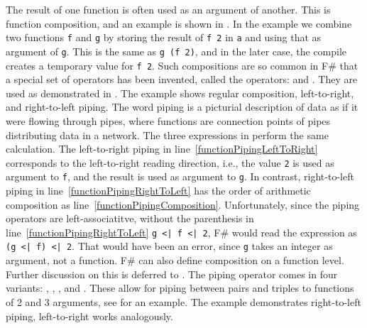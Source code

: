 \documentclass[fsharpnotes.tex]{subfiles}
\begin{document}
The result of one function is often used as an argument of another. This is function composition, and an example is shown in .
%
%
In the example we combine two functions \lstinline{f} and \lstinline{g} by storing the result of \lstinline{f 2} in \lstinline{a} and using that as argument of \lstinline{g}. This is the same as \lstinline{g (f 2)}, and in the later case, the compile creates a temporary value for \lstinline{f 2}. Such compositions are so common in F\# that a special set of operators has been invented, called the  operators: \idx[{|>}@\lstinline{|>}]{\lexeme{|>}} and \idx[{<|}@\lstinline{<|}]{\lexeme{<|}}. They are used as demonstrated in .
%
%
The example shows regular composition, left-to-right, and right-to-left piping. The word piping is a picturial description of data as if it were flowing through pipes, where functions are connection points of pipes distributing data in a network. The three expressions in  perform the same calculation. The left-to-right piping in line~\ref{functionPipingLeftToRight} corresponds to the left-to-right reading direction, i.e., the value \lstinline{2} is used as argument to \lstinline{f}, and the result is used as argument to \lstinline{g}. In contrast, right-to-left piping in line~\ref{functionPipingRightToLeft} has the order of arithmetic composition as line~\ref{functionPipingComposition}. Unfortunately, since the piping operators are left-associatitve, without the parenthesis in line~\ref{functionPipingRightToLeft} \mbox{\lstinline{g <| f <| 2}}, F\# would read the expression as \lstinline{(g <| f) <| 2}. That would have been an error, since \lstinline{g} takes an integer as argument, not a function. F\# can also define composition on a function level. Further discussion on this is deferred to . The piping operator comes in four variants: \lexeme{||>}, \lexeme{<||}, \lexeme{|||>}, and \lexeme{<|||}. These allow for piping between pairs and triples to functions of 2 and 3 arguments, see  for an example.
%
%
The example demonstrates right-to-left piping, left-to-right works analogously.
\end{document}
